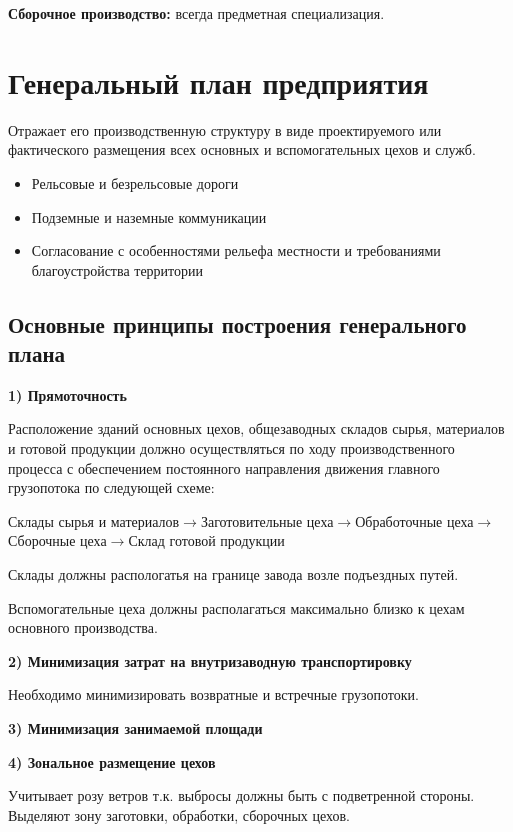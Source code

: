 \documentclass[14pt,a4paper,oneside]{extarticle}
\begin{document}
\textbf{Сборочное производство:} всегда предметная специализация.

\section{Генеральный план предприятия}

Отражает его производственную структуру в виде проектируемого или фактического размещения всех основных и вспомогательных цехов и служб.

\begin{itemize}
    \item Рельсовые и безрельсовые дороги
    \item Подземные и наземные коммуникации
    \item Согласование с особенностями рельефа местности и требованиями благоустройства территории
\end{itemize}

\subsection{Основные принципы построения генерального плана}

\textbf{1) Прямоточность}

Расположение зданий основных цехов, общезаводных складов сырья, материалов и готовой продукции должно осуществляться по ходу производственного процесса с обеспечением постоянного направления движения главного грузопотока по следующей схеме:

\begin{center}
    Склады сырья и материалов$\longrightarrow$Заготовительные цеха$\longrightarrow$Обработочные цеха$\longrightarrow$Сборочные цеха$\longrightarrow$Склад готовой продукции
\end{center}

Склады должны распологатья на границе завода возле подъездных путей.

Вспомогательные цеха должны располагаться максимально близко к цехам основного производства.

\textbf{2) Минимизация затрат на внутризаводную транспортировку}

Необходимо минимизировать возвратные и встречные грузопотоки.

\textbf{3) Минимизация занимаемой площади}

\textbf{4) Зональное размещение цехов}

Учитывает розу ветров т.к. выбросы должны быть с подветренной стороны. Выделяют зону заготовки, обработки, сборочных цехов. 
\end{document}
